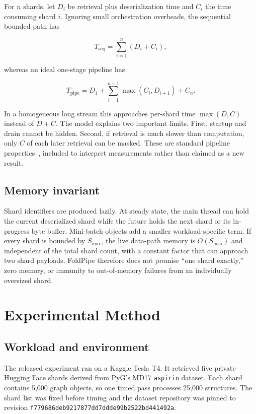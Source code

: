 \documentclass[10pt]{article}
\begin{document}
For $n$ shards, let $D_i$ be retrieval plus deserialization time and $C_i$ the
time consuming shard $i$.  Ignoring small orchestration overheads, the
sequential bounded path has

\begin{equation}
T_{\mathrm{seq}} = \sum_{i=1}^{n}(D_i + C_i),
\end{equation}

whereas an ideal one-stage pipeline has

\begin{equation}
T_{\mathrm{pipe}} = D_1 +
\sum_{i=1}^{n-1}\max(C_i, D_{i+1}) + C_n.
\end{equation}

In a homogeneous long stream this approaches per-shard time
$\max(D,C)$ instead of $D+C$.  The model explains two important limits.  First,
startup and drain cannot be hidden.  Second, if retrieval is much slower than
computation, only $C$ of each later retrieval can be masked.  These are standard
pipeline properties~\cite{shriver1999prefetching,murray2021tfdata}, included to
interpret measurements rather than claimed as a new result.

\subsection{Memory invariant}

Shard identifiers are produced lazily.  At steady state, the main thread can
hold the current deserialized shard while the future holds the next shard or
its in-progress byte buffer.  Mini-batch objects add a smaller workload-specific
term.  If every shard is bounded by $S_{\max}$, the live data-path memory is
$O(S_{\max})$ and independent of the total shard count, with a constant factor
that can approach two shard payloads.  FoldPipe therefore does not promise
``one shard exactly,'' zero memory, or immunity to out-of-memory failures from
an individually oversized shard.

\section{Experimental Method}

\subsection{Workload and environment}

The released experiment ran on a Kaggle Tesla T4.  It retrieved five private
Hugging Face shards derived from PyG's MD17 \texttt{aspirin} dataset.  Each
shard contains 5,000 graph objects, so one timed pass processes 25,000
structures.  The shard list was fixed before timing and the dataset repository
was pinned to revision
\texttt{f779686deb9217877dd7ddde99b2522bd441492a}.
\end{document}
